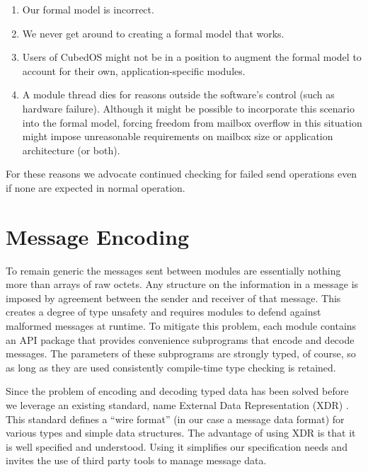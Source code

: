 \begin{enumerate}
\item Our formal model is incorrect.
\item We never get around to creating a formal model that works.
\item Users of CubedOS might not be in a position to augment the formal model to account for
  their own, application-specific modules.
\item A module thread dies for reasons outside the software's control (such as hardware
  failure). Although it might be possible to incorporate this scenario into the formal model,
  forcing freedom from mailbox overflow in this situation might impose unreasonable requirements
  on mailbox size or application architecture (or both).
\end{enumerate}

For these reasons we advocate continued checking for failed send operations even if none are
expected in normal operation.


\section{Message Encoding}
\label{design-message-encoding}

To remain generic the messages sent between modules are essentially nothing more than arrays of
raw octets. Any structure on the information in a message is imposed by agreement between the
sender and receiver of that message. This creates a degree of type unsafety and requires modules
to defend against malformed messages at runtime. To mitigate this problem, each module contains
an API package that provides convenience subprograms that encode and decode messages. The
parameters of these subprograms are strongly typed, of course, so as long as they are used
consistently compile-time type checking is retained.

Since the problem of encoding and decoding typed data has been solved before we leverage an
existing standard, name External Data Representation (XDR) \cite{rfc-4506}. This standard
defines a ``wire format'' (in our case a message data format) for various types and simple data
structures. The advantage of using XDR is that it is well specified and understood. Using it
simplifies our specification needs and invites the use of third party tools to manage message
data.

